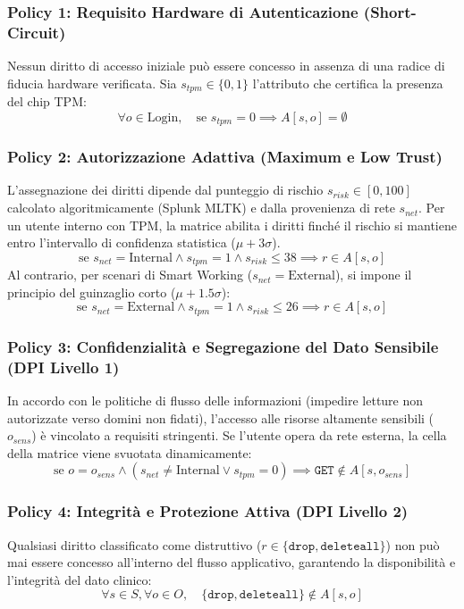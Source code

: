 \subsubsection*{Policy 1: Requisito Hardware di Autenticazione (Short-Circuit)}
Nessun diritto di accesso iniziale può essere concesso in assenza di una radice di fiducia hardware verificata. Sia $s_{tpm} \in \{0, 1\}$ l'attributo che certifica la presenza del chip TPM:
$$ \forall o \in \text{Login}, \quad \text{se } s_{tpm} = 0 \implies A[s, o] = \emptyset $$

\subsubsection*{Policy 2: Autorizzazione Adattiva (Maximum e Low Trust)}
L'assegnazione dei diritti dipende dal punteggio di rischio $s_{risk} \in [0, 100]$ calcolato algoritmicamente (Splunk MLTK) e dalla provenienza di rete $s_{net}$. Per un utente interno con TPM, la matrice abilita i diritti finché il rischio si mantiene entro l'intervallo di confidenza statistica ($\mu + 3\sigma$).
$$ \text{se } s_{net} = \text{Internal} \land s_{tpm} = 1 \land s_{risk} \le 38 \implies r \in A[s, o] $$
Al contrario, per scenari di Smart Working ($s_{net} = \text{External}$), si impone il principio del guinzaglio corto ($\mu + 1.5\sigma$):
$$ \text{se } s_{net} = \text{External} \land s_{tpm} = 1 \land s_{risk} \le 26 \implies r \in A[s, o] $$

\subsubsection*{Policy 3: Confidenzialità e Segregazione del Dato Sensibile (DPI Livello 1)}
In accordo con le politiche di flusso delle informazioni (impedire letture non autorizzate verso domini non fidati), l'accesso alle risorse altamente sensibili ($o_{sens}$) è vincolato a requisiti stringenti. Se l'utente opera da rete esterna, la cella della matrice viene svuotata dinamicamente:
$$ \text{se } o = o_{sens} \land (s_{net} \neq \text{Internal} \lor s_{tpm} = 0) \implies \texttt{GET} \notin A[s, o_{sens}] $$

\subsubsection*{Policy 4: Integrità e Protezione Attiva (DPI Livello 2)}
Qualsiasi diritto classificato come distruttivo ($r \in \{\texttt{drop}, \texttt{deleteall}\}$) non può mai essere concesso all'interno del flusso applicativo, garantendo la disponibilità e l'integrità del dato clinico:
$$ \forall s \in S, \forall o \in O, \quad \{\texttt{drop}, \texttt{deleteall}\} \notin A[s, o] $$

